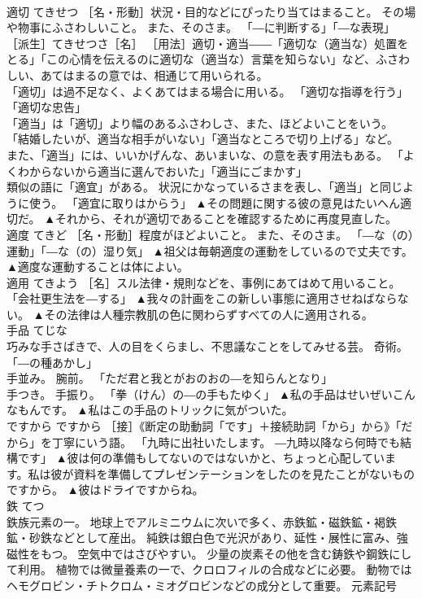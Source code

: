\documentclass[8pt]{extreport}
\begin{document}
\begin{CJK}{UTF8}{min}
\\	適切	てきせつ	［名・形動］状況・目的などにぴったり当てはまること。 その場や物事にふさわしいこと。 また、そのさま。 「―に判断する」「―な表現」 ［派生］てきせつさ［名］ ［用法］適切・適当――「適切な（適当な）処置をとる」「この心情を伝えるのに適切な（適当な）言葉を知らない」など、ふさわしい、あてはまるの意では、相通じて用いられる。 
\\	「適切」は過不足なく、よくあてはまる場合に用いる。 「適切な指導を行う」「適切な忠告」
\\	「適当」は「適切」より幅のあるふさわしさ、また、ほどよいことをいう。 「結婚したいが、適当な相手がいない」「適当なところで切り上げる」など。 
\\	また、「適当」には、いいかげんな、あいまいな、の意を表す用法もある。 「よくわからないから適当に選んでおいた」「適当にごまかす」
\\	類似の語に「適宜」がある。 状況にかなっているさまを表し、「適当」と同じように使う。 「適宜に取りはからう」	▲その問題に関する彼の意見はたいへん適切だ。 ▲それから、それが適切であることを確認するために再度見直した。
\\	適度	てきど	［名・形動］程度がほどよいこと。 また、そのさま。 「―な（の）運動」「―な（の）湿り気」	▲祖父は毎朝適度の運動をしているので丈夫です。 ▲適度な運動することは体によい。
\\	適用	てきよう	［名］スル法律・規則などを、事例にあてはめて用いること。 「会社更生法を―する」	▲我々の計画をこの新しい事態に適用させねばならない。 ▲その法律は人種宗教肌の色に関わらずすべての人に適用される。
\\	手品	てじな	
\\	巧みな手さばきで、人の目をくらまし、不思議なことをしてみせる芸。 奇術。 「―の種あかし」 
\\	手並み。 腕前。 「ただ君と我とがおのおの―を知らんとなり」 
\\	手つき。 手振り。 「拳（けん）の―の手もたゆく」	▲私の手品はせいぜいこんなもんです。 ▲私はこの手品のトリックに気がついた。
\\	ですから	ですから	［接］《断定の助動詞「です」＋接続助詞「から」から》「だから」を丁寧にいう語。 「九時に出社いたします。 ―九時以降なら何時でも結構です」	▲彼は何の準備もしてないのではないかと、ちょっと心配しています。私は彼が資料を準備してプレゼンテーションをしたのを見たことがないものですから。 ▲彼はドライですからね。
\\	鉄	てつ	
\\	鉄族元素の一。 地球上でアルミニウムに次いで多く、赤鉄鉱・磁鉄鉱・褐鉄鉱・砂鉄などとして産出。 純鉄は銀白色で光沢があり、延性・展性に富み、強磁性をもつ。 空気中ではさびやすい。 少量の炭素その他を含む鋳鉄や鋼鉄にして利用。 植物では微量養素の一で、クロロフィルの合成などに必要。 動物ではヘモグロビン・チトクロム・ミオグロビンなどの成分として重要。 元素記号

\end{CJK}
\end{document}

